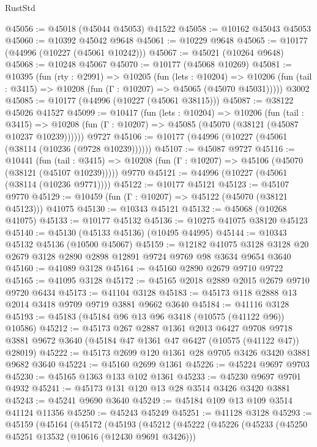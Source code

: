 \begin{lexlean}{RustStd}
\begin{coremodule}
@45056 := @45018 (@45044 @45053) @41522
@45058 := @10162 @45043 @45053
@45060 := @10392 @45042 @9648
@45061 := @10229 @9648
@45065 := @10177 (@44996 (@10227 (@45061 @10242)))
@45067 := @45021 (@10264 @9648)
@45068 := @10248 @45067
@45070 := @10177 (@45068 @10269)
@45081 := @10395
    (fun (rty : @2991) =>
    @10205
      (fun (lets : @10204) =>
      @10206 (fun (tail : @3415) => @10208 (fun (Γ : @10207) => @45065 (@45070 @45031)))))
    @3002
@45085 := @10177 (@44996 (@10227 (@45061 @38115)))
@45087 := @38122 @45026 @41527
@45099 := @10417
    (fun (lets : @10204) =>
    @10206
      (fun (tail : @3415) =>
      @10208 (fun (Γ : @10207) => @45085 (@45070 (@38121 (@45087 @10237 @10239))))))
    @9727
@45106 := @10177 (@44996 (@10227 (@45061 (@38114 (@10236 (@9728 @10239))))))
@45107 := @45087 @9727
@45116 := @10441
    (fun (tail : @3415) => @10208 (fun (Γ : @10207) => @45106 (@45070 (@38121 (@45107 @10239)))))
    @9770
@45121 := @44996 (@10227 (@45061 (@38114 (@10236 @9771))))
@45122 := @10177 @45121
@45123 := @45107 @9770
@45129 := @10459 (fun (Γ : @10207) => @45122 (@45070 (@38121 @45123))) @41075
@45130 := @10343 @45121
@45132 := @45068 (@10268 @41075)
@45133 := @10177 @45132
@45136 := @10275 @41075 @38120 @45123
@45140 := @45130 (@45133 @45136) (@10495 @44995)
@45144 := @10343 @45132 @45136 (@10500 @45067)
@45159 := @12182
    @41075
    @3128
    @3128
    @20
    @2679
    @3128
    @2890
    @2898
    @12891
    @9724
    @9769
    @98
    @3634
    @9654
    @3640
@45160 := @41089 @3128
@45164 := @45160 @2890 @2679 @9710 @9722
@45165 := @41095 @3128
@45172 := @45165 @2018 @2889 @2015 @2679 @9710 @9720 @6434
@45173 := @41104 @3128
@45183 := @45173 @118 @2888 @13 @2014 @3418 @9709 @9719 @3881 @9662 @3640
@45184 := @41116 @3128
@45193 := @45183 (@45184 @96 @13 @96 @3418 (@10575 (@41122 @96)) @10586)
@45212 := @45173
    @267
    @2887
    @1361
    @2013
    @6427
    @9708
    @9718
    @3881
    @9672
    @3640
    (@45184 @47 @1361 @47 @6427 (@10575 (@41122 @47)) @28019)
@45222 := @45173 @2699 @120 @1361 @28 @9705 @3426 @3420 @3881 @9682 @3640
@45224 := @45160 @2699 @1361
@45226 := @45224 @9697 @9703
@45230 := @45165 @1363 @133 @102 @1361
@45233 := @45230 @9697 @9701 @4932
@45241 := @45173 @131 @120 @13 @28 @3514 @3426 @3420 @3881
@45243 := @45241 @9690 @3640
@45249 := @45184 @109 @13 @109 @3514 @41124 @11356
@45250 := @45243 @45249
@45251 := @41128 @3128
@45293 := @45159
    (@45164
      (@45172
        (@45193
          (@45212
            (@45222
              (@45226
                (@45233
                  (@45250 @45251 @13532 (@10616 (@12430 @9691 @3426)))

\end{coremodule}
\end{lexlean}
